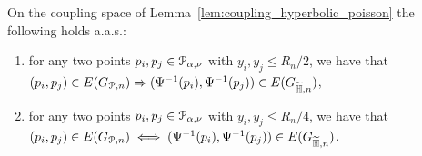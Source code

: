 \begin{lemma}\label{lem:coupling_edges}
On the coupling space of Lemma~\ref{lem:coupling_hyperbolic_poisson} the following holds a.a.s.:
\begin{enumerate}
\item for any two points $p_i, p_j \in {\mathcal P}_{\alpha, \nu}$ with $y_i, y_j \le R_n/2$, we have that $(p_i,p_j) \in E(G_{{\mathcal P},n}) \Rightarrow (\Psi^{-1}(p_i), \Psi^{-1}(p_j)) \in E(G_{\widetilde{\mathbb{H}},n})$, 
\item for any two points $p_i, p_j \in {\mathcal P}_{\alpha, \nu}$ with $y_i, y_j \le R_n/4$, we have that $(p_i,p_j) \in E(G_{{\mathcal P},n}) \iff (\Psi^{-1}(p_i), \Psi^{-1}(p_j)) \in E(G_{\widetilde{\mathbb{H}},n})$.
\end{enumerate}
\end{lemma}



